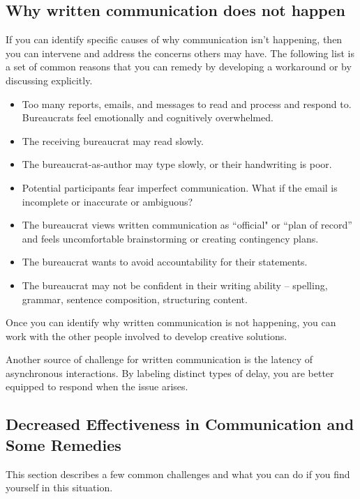 \subsection*{Why written communication does not happen\label{sec:written-comm-does-not-happen}}
If you can identify specific causes of why communication isn't happening, then you can intervene and address the concerns others may have. The following list is a set of common reasons that you can remedy by developing a workaround or by discussing explicitly. 
\begin{itemize}
    \item Too many reports, emails, and messages to read and process and respond to. Bureaucrats feel emotionally and cognitively overwhelmed.
\item The receiving bureaucrat may read slowly.
\item The bureaucrat-as-author may type slowly, or their handwriting is poor.
\item Potential participants fear imperfect communication. What if the email is incomplete or inaccurate or ambiguous?
\item The bureaucrat views written communication as ``official" or ``plan of record'' and feels uncomfortable brainstorming or creating contingency plans.
\item The bureaucrat wants to avoid accountability for their statements.
\item The bureaucrat may not be confident in their writing ability -- spelling, grammar, sentence composition, structuring content.\iftoggle{boundbook}{}{\footnote{For tips on writing, see section~\ref{sec:resources-for-writing}\iftoggle{haspagenumbers}{ on page~\pageref{sec:resources-for-writing}.}{.}}}
\end{itemize}
Once you can identify why written communication is not happening, you can work with the other people involved to develop creative solutions. 

Another source of challenge for written communication is the latency of asynchronous interactions. By labeling distinct types of delay, you are better equipped to respond when the issue arises. 



\subsection*{Decreased Effectiveness in Communication and Some Remedies}

This section describes a few common challenges and what you can do if you find yourself in this situation.

